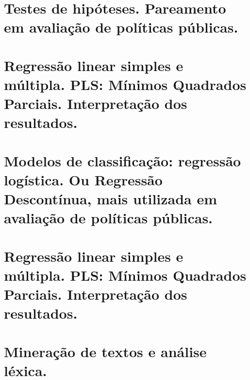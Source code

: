 \documentclass[
]{book}
\begin{document}
\hypertarget{testes-de-hipuxf3teses.-pareamento-em-avaliauxe7uxe3o-de-poluxedticas-puxfablicas.}{%
\chapter{Testes de hipóteses. Pareamento em avaliação de políticas públicas.}\label{testes-de-hipuxf3teses.-pareamento-em-avaliauxe7uxe3o-de-poluxedticas-puxfablicas.}}

\hypertarget{regressuxe3o-linear-simples-e-muxfaltipla.-pls-muxednimos-quadrados-parciais.-interpretauxe7uxe3o-dos-resultados.}{%
\chapter{Regressão linear simples e múltipla. PLS: Mínimos Quadrados Parciais. Interpretação dos resultados.}\label{regressuxe3o-linear-simples-e-muxfaltipla.-pls-muxednimos-quadrados-parciais.-interpretauxe7uxe3o-dos-resultados.}}

\hypertarget{modelos-de-classificauxe7uxe3o-regressuxe3o-loguxedstica.-ou-regressuxe3o-descontuxednua-mais-utilizada-em-avaliauxe7uxe3o-de-poluxedticas-puxfablicas.}{%
\chapter{Modelos de classificação: regressão logística. Ou Regressão Descontínua, mais utilizada em avaliação de políticas públicas.}\label{modelos-de-classificauxe7uxe3o-regressuxe3o-loguxedstica.-ou-regressuxe3o-descontuxednua-mais-utilizada-em-avaliauxe7uxe3o-de-poluxedticas-puxfablicas.}}

\hypertarget{regressuxe3o-linear-simples-e-muxfaltipla.-pls-muxednimos-quadrados-parciais.-interpretauxe7uxe3o-dos-resultados.-1}{%
\chapter{Regressão linear simples e múltipla. PLS: Mínimos Quadrados Parciais. Interpretação dos resultados.}\label{regressuxe3o-linear-simples-e-muxfaltipla.-pls-muxednimos-quadrados-parciais.-interpretauxe7uxe3o-dos-resultados.-1}}

\hypertarget{minerauxe7uxe3o-de-textos-e-anuxe1lise-luxe9xica.}{%
\chapter{Mineração de textos e análise léxica.}\label{minerauxe7uxe3o-de-textos-e-anuxe1lise-luxe9xica.}}

  
\end{document}
